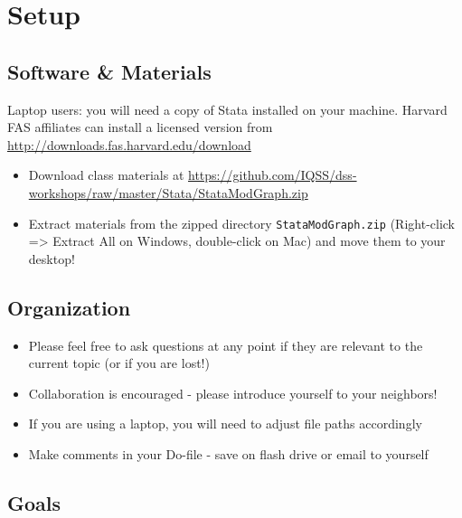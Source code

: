\documentclass[]{book}
\providecommand{\tightlist}{%
  \setlength{\itemsep}{0pt}\setlength{\parskip}{0pt}}
\begin{document}
\section{Setup}\label{setup-8}

\subsection{Software \& Materials}\label{software-materials-2}

Laptop users: you will need a copy of Stata installed on your machine.
Harvard FAS affiliates can install a licensed version from
\url{http://downloads.fas.harvard.edu/download}

\begin{itemize}
\tightlist
\item
  Download class materials at
  \url{https://github.com/IQSS/dss-workshops/raw/master/Stata/StataModGraph.zip}
\item
  Extract materials from the zipped directory \texttt{StataModGraph.zip}
  (Right-click =\textgreater{} Extract All on Windows, double-click on
  Mac) and move them to your desktop!
\end{itemize}

\subsection{Organization}\label{organization-2}

\begin{itemize}
\tightlist
\item
  Please feel free to ask questions at any point if they are relevant to
  the current topic (or if you are lost!)
\item
  Collaboration is encouraged - please introduce yourself to your
  neighbors!
\item
  If you are using a laptop, you will need to adjust file paths
  accordingly
\item
  Make comments in your Do-file - save on flash drive or email to
  yourself
\end{itemize}

\subsection{Goals}\label{goals-5}
\end{document}
